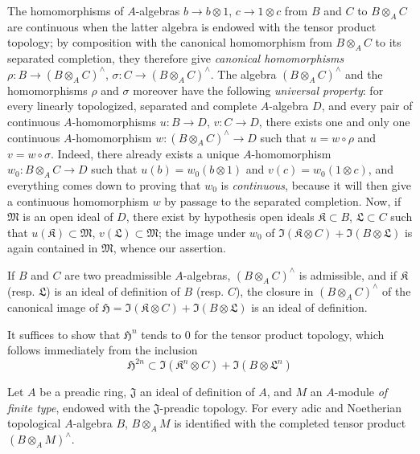 \begin{env}[7.7.6]
\label{0.7.7.6}
The homomorphisms of $A$-algebras $b\to b\otimes 1$,
$c\to 1\otimes c$ from $B$ and $C$ to $B\otimes_A C$ are continuous
when the latter algebra is endowed with the tensor product topology;
by composition with the canonical homomorphism from $B\otimes_A C$ to its
separated completion, they therefore give \emph{canonical homomorphisms}
$\rho:B\to(B\otimes_A C)^\wedge$, $\sigma:C\to(B\otimes_A C)^\wedge$.
The algebra $(B\otimes_A C)^\wedge$ and the homomorphisms $\rho$ and $\sigma$
moreover have the following \emph{universal property}: for every
linearly topologized, separated and complete $A$-algebra $D$, and every
pair of continuous $A$-homomorphisms $u:B\to D$, $v:C\to D$, there exists one
and only one continuous $A$-homomorphism
$w:(B\otimes_A C)^\wedge\to D$ such that $u=w\circ\rho$ and
$v=w\circ\sigma$. Indeed, there already exists a unique $A$-homomorphism
$w_0:B\otimes_A C\to D$ such that $u(b)=w_0(b\otimes 1)$ and
$v(c)=w_0(1\otimes c)$, and everything comes down to proving that $w_0$ is \emph{continuous},
because it will then give a continuous
homomorphism $w$ by passage to the separated completion. Now, if
$\mathfrak M$ is an open ideal of $D$, there exist by hypothesis open
ideals $\mathfrak K\subset B$, $\mathfrak L\subset C$ such that
$u(\mathfrak K)\subset\mathfrak M$, $v(\mathfrak L)\subset\mathfrak M$;
the image under $w_0$ of
$\Im(\mathfrak K\otimes C)+\Im(B\otimes\mathfrak L)$ is again
contained in $\mathfrak M$, whence our assertion.
\end{env}

\begin{proposition}[7.7.7]
\label{0.7.7.7}
If $B$ and $C$ are two preadmissible $A$-algebras,
$(B\otimes_A C)^\wedge$ is admissible, and if $\mathfrak K$ \textup{(resp.
$\mathfrak L$)} is an ideal of definition of $B$ \textup{(resp. $C$)}, the closure
in $(B\otimes_A C)^\wedge$ of the canonical image of
$\mathfrak H=\Im(\mathfrak K\otimes C)+\Im(B\otimes\mathfrak L)$ is
an ideal of definition.
\end{proposition}

It suffices to show that $\mathfrak H^n$ tends to $0$ for the tensor
product topology, which follows immediately from the inclusion
\[
  \mathfrak H^{2n}\subset
  \Im(\mathfrak K^n\otimes C)+\Im(B\otimes\mathfrak L^n)
\]

\begin{proposition}[7.7.8]
\label{0.7.7.8}
Let $A$ be a preadic ring, $\mathfrak J$ an ideal of definition of
$A$, and $M$ an $A$-module \emph{of finite type}, endowed with the
$\mathfrak J$-preadic topology. For every adic and Noetherian topological
$A$-algebra $B$, $B\otimes_A M$ is identified with the completed tensor product
$(B\otimes_A M)^\wedge$.
\end{proposition}

